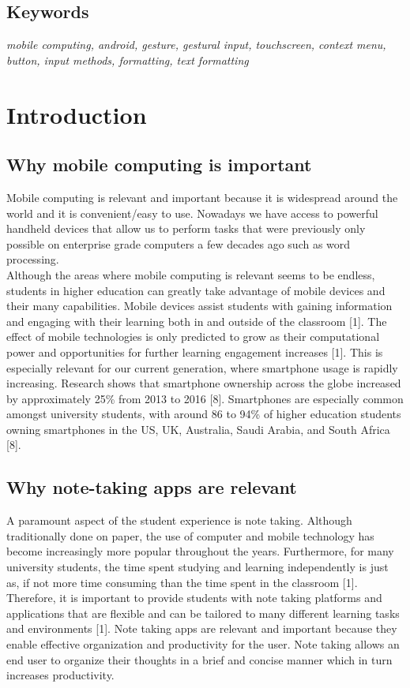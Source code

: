\documentclass[conference]{IEEEtran}
\begin{document}
\subsection*{Keywords}
\textit{mobile computing, android, gesture, gestural input, touchscreen, context menu, button, input methods, formatting, text formatting}


\section{Introduction}

\subsection{Why mobile computing is important}
Mobile computing is relevant and important because it is widespread around the world and it is convenient/easy to use. Nowadays we have access to powerful handheld devices that allow us to perform tasks that were previously only possible on enterprise grade computers a few decades ago such as word processing. \\

Although the areas where mobile computing is relevant seems to be endless, students in higher education can greatly take advantage of mobile devices and their many capabilities. Mobile devices assist students with gaining information and engaging with their learning both in and outside of the classroom [1]. The effect of mobile technologies is only predicted to grow as their computational power and opportunities for further learning engagement increases [1]. This is especially relevant for our current generation, where smartphone usage is rapidly increasing. Research shows that smartphone ownership across the globe increased by approximately 25\% from 2013 to 2016 [8]. Smartphones are especially common amongst university students, with around 86 to 94\% of higher education students owning smartphones in the US, UK, Australia, Saudi Arabia, and South Africa [8].

\subsection{Why note-taking apps are relevant}
A paramount aspect of the student experience is note taking. Although traditionally done on paper, the use of computer and mobile technology has become increasingly more popular throughout the years. Furthermore, for many university students, the time spent studying and learning independently is just as, if not more time consuming than the time spent in the classroom [1]. Therefore, it is important to provide students with note taking platforms and applications that are flexible and can be tailored to many different learning tasks and environments [1]. Note taking apps are relevant and important because they enable effective organization and productivity for the user. Note taking allows an end user to organize their thoughts in a brief and concise manner which in turn increases productivity.
\end{document}
